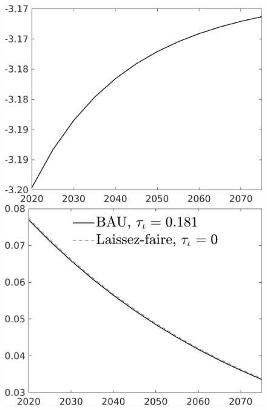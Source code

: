 \documentclass[12pt]{article}
\begin{document}
\begin{figure}[h!!]
\begin{minipage}[]{0.32\textwidth}
	\end{minipage}	
	\begin{minipage}[]{0.32\textwidth}
		\includegraphics[width=1\textwidth]{../../codding_model/own_basedOnFried/optimalPol_010922_revision/figures/all_13Sept22/CompTaul_Equlab_LFBAUPer_Reg0_wl_spillover0_nsk0_xgr0_knspil1_sep1_countec0_GovRev0_etaa0.79.png}
	\end{minipage}	
	\begin{minipage}[]{0.32\textwidth}
		\includegraphics[width=1\textwidth]{../../codding_model/own_basedOnFried/optimalPol_010922_revision/figures/all_13Sept22/CompTaul_Equlab_LFBAU_Reg0_GFF_spillover0_nsk0_xgr0_knspil1_sep1_countec0_GovRev0_etaa0.79_lgd1.png}

\end{minipage}
\end{figure}
\end{document}
